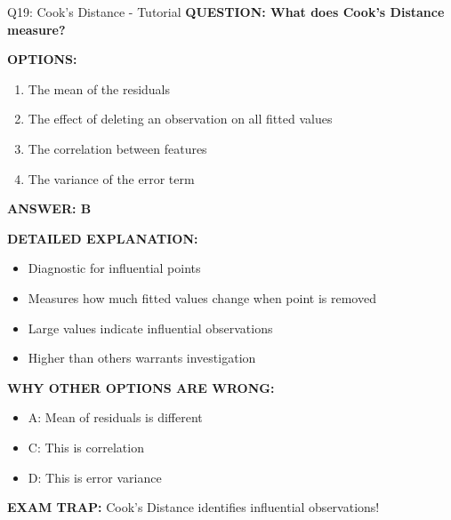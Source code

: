 \documentclass[8pt]{beamer}
\begin{document}
	\begin{frame}{Q19: Cook's Distance - Tutorial}
		\fontsize{6.5}{7.5}\selectfont
		\textbf{QUESTION: What does Cook's Distance measure?}
		
		\vspace{0.1cm}
		\textbf{OPTIONS:}
		\begin{enumerate}
			\item The mean of the residuals
			\item The effect of deleting an observation on all fitted values
			\item The correlation between features
			\item The variance of the error term
		\end{enumerate}
		
		\vspace{0.1cm}
		\textcolor{myblue}{\textbf{ANSWER: B}}
		
		\vspace{0.1cm}
		\textbf{DETAILED EXPLANATION:}
		\begin{itemize}
			\item Diagnostic for influential points
			\item Measures how much fitted values change when point is removed
			\item Large values indicate influential observations
			\item Higher than others warrants investigation
		\end{itemize}
		
		\vspace{0.1cm}
		\textcolor{myred}{\textbf{WHY OTHER OPTIONS ARE WRONG:}}
		\begin{itemize}
			\item \textcolor{myred}{A:} Mean of residuals is different
			\item \textcolor{myred}{C:} This is correlation
			\item \textcolor{myred}{D:} This is error variance
		\end{itemize}
		
		\textcolor{myred}{\textbf{EXAM TRAP:}} Cook's Distance identifies \textcolor{myblue}{influential observations}!
	\end{frame}
	
\end{document}
